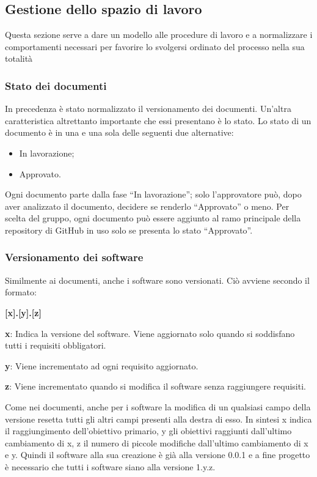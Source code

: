\subsection{Gestione dello spazio di lavoro}
Questa sezione serve a dare un modello alle procedure di lavoro e a normalizzare i comportamenti
necessari per favorire lo svolgersi ordinato del processo nella sua totalità
\subsubsection{Stato dei documenti}
In precedenza è stato normalizzato il versionamento dei documenti.
Un'altra caratteristica altrettanto importante che essi presentano è lo stato.
Lo stato di un documento è in una e una sola delle seguenti due alternative:
\begin{itemize}
    \item In lavorazione;
    \item Approvato.
\end{itemize}
Ogni documento parte dalla fase ``In lavorazione''; solo l'approvatore può, dopo aver analizzato il 
documento, decidere se renderlo ``Approvato'' o meno. \newline
Per scelta del gruppo, ogni documento può essere aggiunto al ramo principale della repository di GitHub 
in uso solo se presenta lo stato ``Approvato''.
\subsubsection{Versionamento dei software}
Similmente ai documenti, anche i software sono versionati. Ciò avviene secondo il formato:
\begin{center}
    \textbf{[x].[y].[z]}
\end{center}
\begin{description}
    \item \textbf{x}: Indica la versione del software.
            Viene aggiornato solo quando si soddisfano tutti i requisiti obbligatori. 
    \item \textbf{y}: Viene incrementato ad ogni requisito aggiornato.
    \item \textbf{z}: Viene incrementato quando si modifica il software senza raggiungere requisiti.
\end{description}
Come nei documenti, anche per i software la modifica di un qualsiasi campo della versione resetta tutti gli 
altri campi presenti alla destra di esso. \newline
In sintesi x indica il raggiungimento dell'obiettivo primario, y gli obiettivi raggiunti dall'ultimo cambiamento di x,
z il numero di piccole modifiche dall'ultimo cambiamento di x e y. \newline
Quindi il software alla sua creazione è già alla versione 0.0.1 e a fine progetto è necessario che 
tutti i software siano alla versione 1.y.z.

